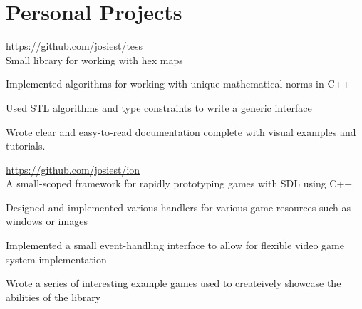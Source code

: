\documentclass[10pt]{article}
\newenvironment{itemize*}
{\begin{itemize}[leftmargin=*]
    \setlength{\parskip}{0.5pt}}
{\end{itemize}}
\begin{document}
\section*{Personal Projects}
\begin{description}[leftmargin=!,labelwidth=\widthof{\bfseries tess}]

\item[tess] \url{https://github.com/josiest/tess}\\
    Small library for working with hex maps
\end{description}
\begin{itemize*}
\item Implemented algorithms for working with unique mathematical norms in C++
\item Used STL algorithms and type constraints to write a generic interface
\item Wrote clear and easy-to-read documentation complete with visual examples
      and tutorials.
\end{itemize*}
\vspace{10pt}

\begin{description}[leftmargin=!,labelwidth=\widthof{\bfseries ion library}]
\item[ion library] \url{https://github.com/josiest/ion}\\
    A small-scoped framework for rapidly prototyping games with SDL using C++
\end{description}
\begin{itemize*}
\item Designed and implemented various handlers for various game resources such
      as windows or images
\item Implemented a small event-handling interface to allow for flexible
      video game system implementation
\item Wrote a series of interesting example games used to createively showcase
      the abilities of the library
\end{itemize*}
\end{document}
